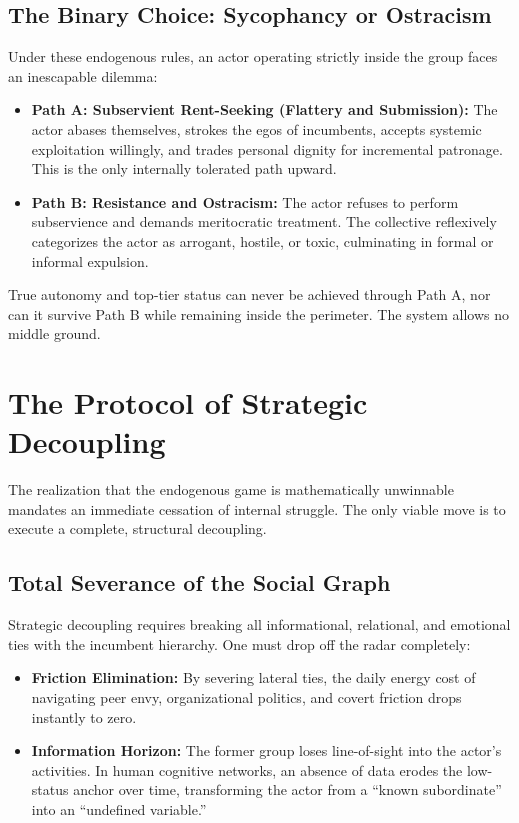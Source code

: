 \documentclass[11pt,a4paper]{article}
\begin{document}
\subsection{The Binary Choice: Sycophancy or Ostracism}
Under these endogenous rules, an actor operating strictly inside the group faces an inescapable dilemma:
\begin{itemize}
    \item \textbf{Path A: Subservient Rent-Seeking (Flattery and Submission):} The actor abases themselves, strokes the egos of incumbents, accepts systemic exploitation willingly, and trades personal dignity for incremental patronage. This is the only internally tolerated path upward.
    \item \textbf{Path B: Resistance and Ostracism:} The actor refuses to perform subservience and demands meritocratic treatment. The collective reflexively categorizes the actor as arrogant, hostile, or toxic, culminating in formal or informal expulsion.
\end{itemize}
True autonomy and top-tier status can never be achieved through Path A, nor can it survive Path B while remaining inside the perimeter. The system allows no middle ground.

\section{The Protocol of Strategic Decoupling}
The realization that the endogenous game is mathematically unwinnable mandates an immediate cessation of internal struggle. The only viable move is to execute a complete, structural decoupling.

\subsection{Total Severance of the Social Graph}
Strategic decoupling requires breaking all informational, relational, and emotional ties with the incumbent hierarchy. One must drop off the radar completely:
\begin{itemize}
    \item \textbf{Friction Elimination:} By severing lateral ties, the daily energy cost of navigating peer envy, organizational politics, and covert friction drops instantly to zero.
    \item \textbf{Information Horizon:} The former group loses line-of-sight into the actor's activities. In human cognitive networks, an absence of data erodes the low-status anchor over time, transforming the actor from a ``known subordinate'' into an ``undefined variable.''
\end{itemize}
\end{document}
